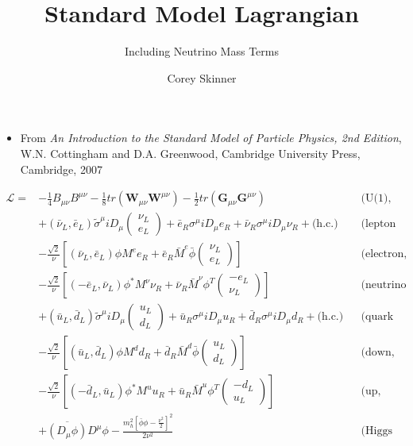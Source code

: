 \documentclass[12pt,a4paper,pagesize=pdftex]{scrartcl}
\title{Standard Model Lagrangian}
\subtitle{Including Neutrino Mass Terms}
\author{Corey Skinner}
\date{}
\newcommand{\icol}[1]{%
  \left(\begin{smallmatrix}#1\end{smallmatrix}\right)%
}
\begin{document}
\pdfpageheight 11in
\pdfpagewidth 8.5in

\maketitle

\begin{itemize}
	\item From \textit{An Introduction to the Standard Model of Particle Physics, 2nd Edition}, W.N. Cottingham and D.A. Greenwood, Cambridge University Press, Cambridge, 2007
\end{itemize}

\begin{align*}
	\mathcal{L} = &-\frac{1}{4} B_{\mu\nu}B^{\mu\nu} - \frac{1}{8}tr\left(\mathbf{W}_{\mu\nu}\mathbf{W}^{\mu\nu}\right) - \frac{1}{2}tr\left(\mathbf{G}_{\mu\nu}\mathbf{G}^{\mu\nu}\right) && \text{(U(1), SU(2), and SU(3) gauge terms)} \\
	&+ \left(\bar{\nu}_L,\bar{e}_L\right)\tilde{\sigma}^\mu iD_\mu\icol{\nu_L\\e_L} + \bar{e}_R\sigma^\mu iD_\mu e_R + \bar{\nu}_R\sigma^\mu iD_\mu\nu_R + \text{(h.c.)} && \text{(lepton dynamical term)} \\
	&-\frac{\sqrt{2}}{\nu}\left[\left(\bar{\nu}_L,\bar{e}_L\right)\phi M^ee_R+\bar{e}_R\bar{M}^e\bar{\phi}\icol{\nu_L\\e_L}\right] && \text{(electron, muon, tauon mass term)} \\
	&-\frac{\sqrt{2}}{\nu}\left[\left(-\bar{e}_L,\bar{\nu}_L\right)\phi^{*}M^\nu\nu_R+\bar{\nu}_R\bar{M}^\nu\phi^T\icol{-e_L\\\nu_L}\right] && \text{(neutrino mass term)} \\
	& +\left(\bar{u}_L, \bar{d}_L\right)\tilde{\sigma}^\mu iD_\mu \icol{u_L\\d_L} + \bar{u}_R\sigma^\mu iD_\mu u_R + \bar{d}_R\sigma^\mu iD_\mu d_R + \text{(h.c.)} && \text{(quark dynamical term)} \\
	&- \frac{\sqrt{2}}{\nu}\left[\left(\bar{u}_L,\bar{d}_L\right)\phi M^dd_R+\bar{d}_R\bar{M}^d\bar{\phi}\icol{u_L\\d_L}\right] && \text{(down, strange, bottom mass term)} \\
	&-\frac{\sqrt{2}}{\nu}\left[\left(-\bar{d}_L,\bar{u}_L\right)\phi^{*}M^uu_R+\bar{u}_R\bar{M}^u\phi^T\icol{-d_L\\u_L}\right] && \text{(up, charmed, top mass term)} \\
	&+\overline{\left(D_\mu\phi\right)}D^\mu\phi-\frac{m_h^2\left[\bar{\phi}\phi-\frac{\nu^2}{2}\right]^2}{2\nu^2} && \text{(Higgs dynamical and mass term)}
\end{align*}
\end{document}
